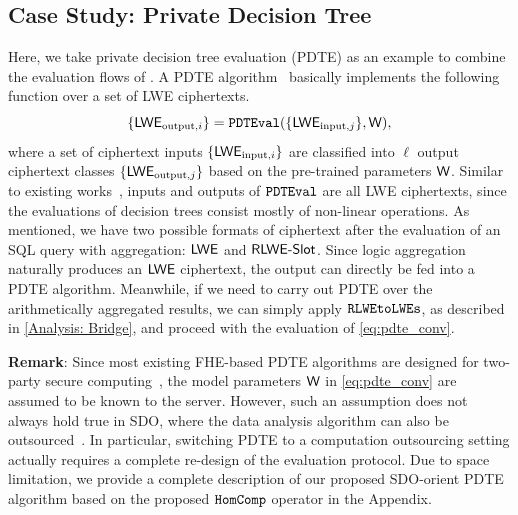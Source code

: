 
\subsection{Case Study: Private Decision Tree}\label{Analysis: PDTE}
Here, we take private decision tree evaluation (PDTE) as an example to combine the 
evaluation flows of \NAME.
A PDTE algorithm~\cite{sortinghat, pegasus} basically implements the following function 
over a set of LWE ciphertexts.
\begin{equation}
\{{\mathsf{LWE}}_{{\rm output}, i}\}= \texttt{PDTEval}(\{{\mathsf{LWE}}_{{\rm input}, j}\}, \mathsf{W}),
\label{eq:pdte_conv}
\end{equation}
where a set of ciphertext inputs $\{{\mathsf{LWE}}_{{\rm input}, i}\}$ are
classified into $\ell$ output
ciphertext classes $\{{\mathsf{LWE}}_{{\rm output}, j}\}$ based on the pre-trained parameters $\mathsf{W}$. 
Similar to existing works~\cite{sortinghat}, inputs and outputs of $\texttt{PDTEval}$ are all LWE 
ciphertexts, since the evaluations of decision
trees consist mostly of non-linear operations. As mentioned,
we have two possible formats of ciphertext after the evaluation of an SQL query 
with aggregation: ${\mathsf{LWE}}$ and ${\mathsf{RLWE\text{-}Slot}}$. Since logic aggregation naturally produces
an ${\mathsf{LWE}}$ ciphertext, the output can directly be fed into a PDTE algorithm. Meanwhile,
if we need to carry out PDTE over the arithmetically aggregated results, we can
simply apply $\texttt{RLWEtoLWEs}$, as described in \cref{Analysis: Bridge}, and proceed with
the evaluation of \cref{eq:pdte_conv}. %

{\bf{Remark}}: Since most existing FHE-based PDTE algorithms are designed for 
two-party secure computing~\cite{pegasus, sortinghat}, the model parameters 
$\mathsf{W}$ in \cref{eq:pdte_conv} are assumed to be known to the server. 
However, such an assumption does not always hold true in SDO, where the
data analysis algorithm can also be 
outsourced~\cite{shan2018practical,matsuoka2021virtual}. In particular,
switching PDTE to a computation outsourcing setting actually requires a complete
re-design of the evaluation protocol. Due to space limitation, we provide a complete 
description of our proposed SDO-orient PDTE algorithm based on the proposed
$\texttt{HomComp}$ operator in the Appendix.



